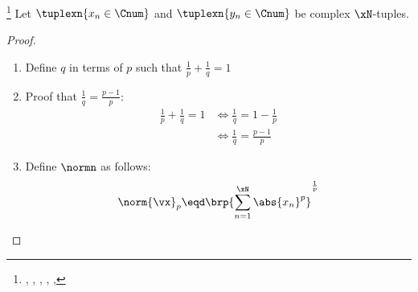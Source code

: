 \begin{theorem}
\footnote{
  ,
  ,
  ,
  ,
  ,
  }
\label{thm:lp_minkowski}
Let $\tuplexn{x_n\in\Cnum}$ and $\tuplexn{y_n\in\Cnum}$ be complex $\xN$-tuples. 
\end{theorem}
\begin{proof}
\mbox{}\\
\begin{enumerate}
  \item Define $q$ in terms of $p$ such that $\frac{1}{p}+\frac{1}{q}=1$

  \item Proof that $\frac{1}{q} = \frac{p-1}{p}$:  \label{item:lp_minkowski_qp}
    \begin{align*}
      \frac{1}{p}+\frac{1}{q}=1
        &\iff \frac{1}{q} = 1-\frac{1}{p}
      \\&\iff \frac{1}{q} = \frac{p-1}{p}
    \end{align*}

  \item Define $\normn$ as follows:
    \[ \norm{\vx}_p \eqd \brp{\sum_{n=1}^{\xN} \abs{x_n}^p}^\frac{1}{p} \]


\end{enumerate}
\end{proof}
